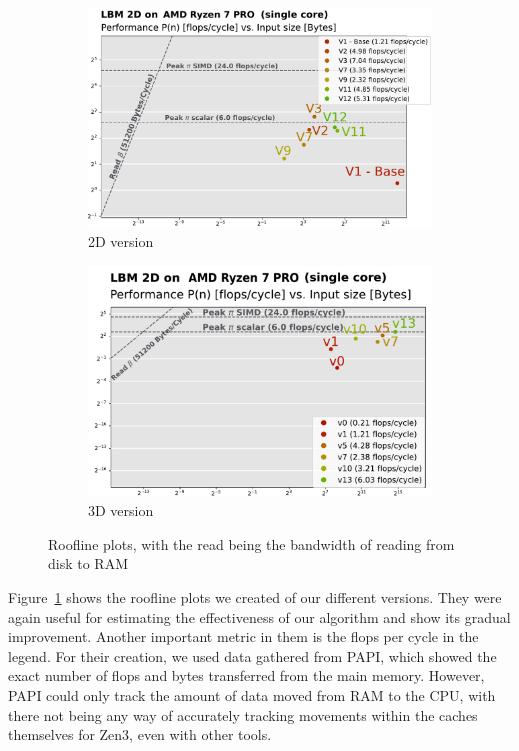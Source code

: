 \documentclass[letterpaper]{article}
\begin{document}
\begin{figure}[h!]
\begin{subfigure}[t]{\linewidth}
    \includegraphics[width=\linewidth]{fig/2D_artifacts/roofline_plot_report.out.pdf}
    \caption{2D version}
\end{subfigure}
\begin{subfigure}[t]{\linewidth}
    \includegraphics[width=\linewidth]{fig/3D_artifacts/roofline_plot_report.out.pdf}
    \caption{3D version}
\end{subfigure}
    \caption{Roofline plots, with the read being the bandwidth of reading from disk to RAM}
    \label{fig:rooflines}
\end{figure}

Figure~\ref{fig:rooflines} shows the roofline plots we created of our different versions.
They were again useful for estimating the effectiveness of our algorithm and show its gradual improvement.
Another important metric in them is the flops per cycle in the legend.
For their creation, we used data gathered from PAPI, which showed the exact number of flops and bytes transferred from the main memory.
However, PAPI could only track the amount of data moved from RAM to the CPU, with there not being any way of accurately tracking movements within the caches themselves for Zen3, even with other tools.
\end{document}
